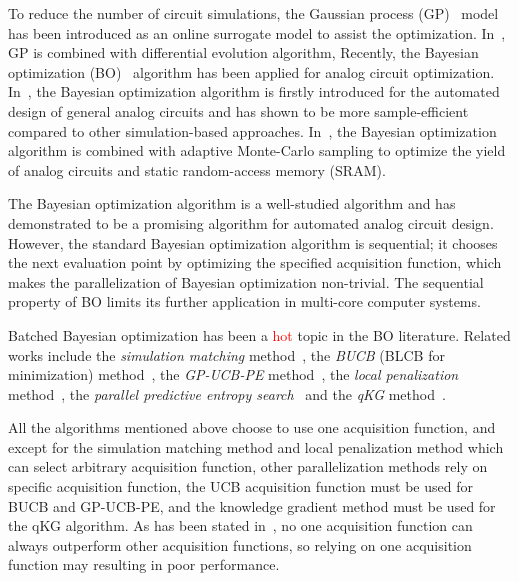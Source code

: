 %
To reduce the number of circuit simulations, the Gaussian process
(GP)~\cite{GPML} model has been introduced as an online surrogate model to
assist the optimization. In~\cite{liu2014gaspad}, GP is combined with
differential evolution algorithm, Recently, the
Bayesian optimization (BO)~\cite{shahriari2016taking} algorithm has been
applied for analog circuit optimization. In~\cite{lyu2017efficient}, the Bayesian optimization algorithm is
firstly introduced for the automated design of general analog circuits and has
shown to be more sample-efficient compared to other simulation-based
approaches. In~\cite{wang2017efficient}, the Bayesian optimization algorithm
is combined with adaptive Monte-Carlo sampling to optimize the yield of analog
circuits and static random-access memory (SRAM).

The Bayesian optimization algorithm is a well-studied algorithm and has
demonstrated to be a promising algorithm for automated analog circuit design.
However, the standard Bayesian optimization algorithm is sequential; it chooses
the next evaluation point by optimizing the specified acquisition function,
which makes the parallelization of Bayesian optimization non-trivial. The
sequential property of BO limits its further application in multi-core computer
systems.

Batched Bayesian optimization has been a \textcolor{red}{hot} topic in the BO
literature. Related works include the \emph{simulation matching}
method~\cite{azimi2010batch}, the \emph{BUCB} (BLCB for minimization)
method~\cite{desautels2014parallelizing}, the \emph{GP-UCB-PE}
method~\cite{contal2013parallel}, the \emph{local penalization}
method~\cite{gonzalez2016batch}, the \emph{parallel predictive entropy
search}~\cite{shah2015parallel} and the \emph{qKG}
method~\cite{wu2016parallel}.


All the algorithms mentioned above choose to use one acquisition function, and
except for the simulation matching method and local penalization method which
can select arbitrary acquisition function, other parallelization methods rely
on specific acquisition function, the UCB acquisition function must be used for
BUCB and GP-UCB-PE, and the knowledge gradient method must be used for the qKG
algorithm. As has been stated in~\cite{hoffman2011portfolio}, no one
acquisition function can always outperform other acquisition functions, so
relying on one acquisition function may resulting in poor performance. 

